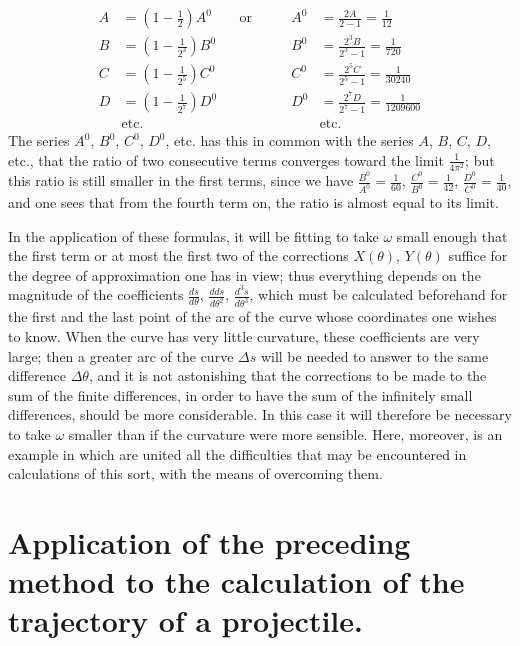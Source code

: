 \documentclass{article}
\begin{document}
\[ \begin{aligned} A&=\left(1-\frac{1}{2}\right)A^{0} &&\text{or}\qquad & A^{0}&=\frac{2A}{2-1}=\frac{1}{12}\\ B&=\left(1-\frac{1}{2^{3}}\right)B^{0} &&& B^{0}&=\frac{2^{3}B}{2^{3}-1}=\frac{1}{720}\\ C&=\left(1-\frac{1}{2^{5}}\right)C^{0} &&& C^{0}&=\frac{2^{5}C}{2^{5}-1}=\frac{1}{30240}\\ D&=\left(1-\frac{1}{2^{7}}\right)D^{0} &&& D^{0}&=\frac{2^{7}D}{2^{7}-1}=\frac{1}{1209600}\\ &\text{etc.} &&& &\text{etc.} \end{aligned} \]
The series $A^{0}$, $B^{0}$, $C^{0}$, $D^{0}$, etc. has this in common with the series $A$, $B$, $C$, $D$, etc., that the ratio of two consecutive terms converges toward the limit $\frac{1}{4\pi^{2}}$; but this ratio is still smaller in the first terms, since we have $\frac{B^{0}}{A^{0}}=\frac{1}{60}$, $\frac{C^{0}}{B^{0}}=\frac{1}{42}$, $\frac{D^{0}}{C^{0}}=\frac{1}{40}$, and one sees that from the fourth term on, the ratio is almost equal to its limit.

In the application of these formulas, it will be fitting to take $\omega$ small enough that the first term or at most the first two of the corrections $X(\theta)$, $Y(\theta)$ suffice for the degree of approximation one has in view; thus everything depends on the magnitude of the coefficients $\frac{ds}{d\theta}$, $\frac{dds}{d\theta^{2}}$, $\frac{d^{3}s}{d\theta^{3}}$, which must be calculated beforehand for the first and the last point of the arc of the curve whose coordinates one wishes to know. When the curve has very little curvature, these coefficients are very large; then a greater arc of the curve $\Delta s$ will be needed to answer to the same difference $\Delta\theta$, and it is not astonishing that the corrections to be made to the sum of the finite differences, in order to have the sum of the infinitely small differences, should be more considerable. In this case it will therefore be necessary to take $\omega$ smaller than if the curvature were more sensible. Here, moreover, is an example in which are united all the difficulties that may be encountered in calculations of this sort, with the means of overcoming them.

\section*{Application of the preceding method to the calculation of the trajectory of a projectile.}
\end{document}

